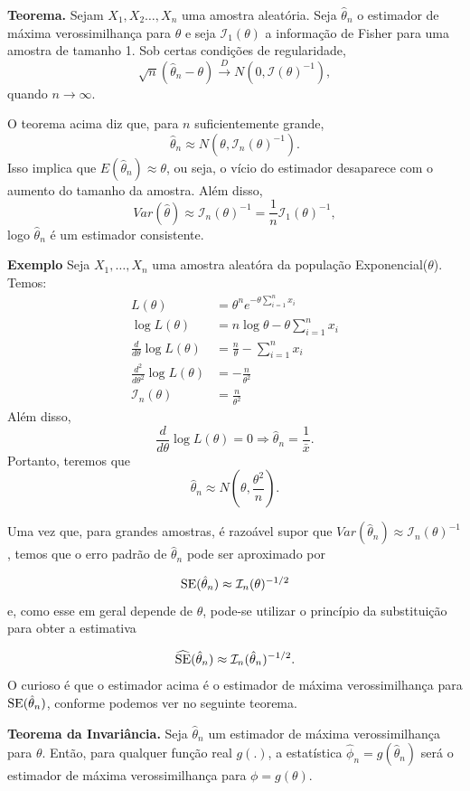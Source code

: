 \documentclass[
  letterpaper,
  DIV=11,
  numbers=noendperiod]{scrartcl}
\begin{document}
\textbf{Teorema.} Sejam \(X_1,X_2\ldots,X_n\) uma amostra aleatória.
Seja \(\hat{\theta}_n\) o estimador de máxima verossimilhança para
\(\theta\) e seja \(\mathcal{I}_{1}(\theta)\) a informação de Fisher
para uma amostra de tamanho 1. Sob certas condições de regularidade,
\[\sqrt{n}(\hat{\theta}_n-\theta)\stackrel{D}{\rightarrow}N\left(0,\mathcal{I}(\theta)^{-1}\right),\]
quando \(n\rightarrow\infty\).

O teorema acima diz que, para \(n\) suficientemente grande,
\[\hat{\theta}_n\approx N\left(\theta,\mathcal{I}_n(\theta)^{-1}\right).\]
Isso implica que \(E(\hat{\theta}_n)\approx \theta\), ou seja, o vício
do estimador desaparece com o aumento do tamanho da amostra. Além disso,
\[Var(\hat{\theta})\approx\mathcal{I}_{n}(\theta)^{-1}=\frac{1}{n}\mathcal{I}_1(\theta)^{-1},\]
logo \(\hat{\theta}_n\) é um estimador consistente.

\textbf{Exemplo} Seja \(X_1,\ldots,X_n\) uma amostra aleatóra da
população Exponencial(\(\theta\)). Temos: \[\begin{align*}
L(\theta)&=\theta^ne^{-\theta\sum_{i=1}^{n}x_i}\\
\log L(\theta)&=n\log\theta - \theta \sum_{i=1}^{n}x_i \\
\frac{d}{d\theta}\log L(\theta)&= \frac{n}{\theta} - \sum_{i=1}^{n}x_i \\
\frac{d^2}{d\theta^2}\log L(\theta)&=-\frac{n}{\theta^2}\\
\mathcal{I}_n(\theta)&=\frac{n}{\theta^2} 
\end{align*}\] Além disso,
\[\frac{d}{d\theta}\log L(\theta)=0\Rightarrow \hat{\theta}_n=\frac{1}{\bar{x}}.\]
Portanto, teremos que
\[\hat{\theta}_n\approx N\left(\theta,\frac{\theta^2}{n}\right).\]

Uma vez que, para grandes amostras, é razoável supor que
\(Var(\hat{\theta}_n)\approx \mathcal{I}_n(\theta)^{-1}\), temos que o
erro padrão de \(\hat{\theta}_n\) pode ser aproximado por

\[\hbox{SE}(\hat{\theta}_n)\approx \mathcal{I}_n(\theta)^{-1/2}\] e,
como esse em geral depende de \(\theta\), pode-se utilizar o princípio
da substituição para obter a estimativa

\[\widehat{\hbox{SE}}(\hat{\theta}_n)\approx \mathcal{I}_n(\hat{\theta}_{n})^{-1/2}.\]
O curioso é que o estimador acima é o estimador de máxima
verossimilhança para \(\hbox{SE}(\hat{\theta}_n)\), conforme podemos ver
no seguinte teorema.

\textbf{Teorema da Invariância.} Seja \(\hat{\theta}_n\) um estimador de
máxima verossimilhança para \(\theta\). Então, para qualquer função real
\(g(.)\), a estatística \(\hat{\phi}_n=g(\hat{\theta}_n)\) será o
estimador de máxima verossimilhança para \(\phi=g(\theta)\).
\end{document}
